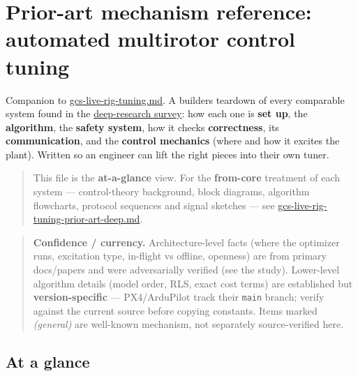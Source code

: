 \documentclass[
  11pt,
]{article}
\author{}
\date{}
\begin{document}
\hypertarget{prior-art-mechanism-reference-automated-multirotor-control-tuning}{%
\section{Prior-art mechanism reference: automated multirotor control
tuning}\label{prior-art-mechanism-reference-automated-multirotor-control-tuning}}

Companion to \url{gcs-live-rig-tuning.md}. A builder\textquotesingle s
teardown of every comparable system found in the
\href{gcs-live-rig-tuning.md\#feasibility-verdict}{deep-research
survey}: how each one is \textbf{set up}, the \textbf{algorithm}, the
\textbf{safety system}, how it checks \textbf{correctness}, its
\textbf{communication}, and the \textbf{control mechanics} (where and
how it excites the plant). Written so an engineer can lift the right
pieces into their own tuner.

\begin{quote}
This file is the \textbf{at-a-glance} view. For the \textbf{from-core}
treatment of each system --- control-theory background, block diagrams,
algorithm flowcharts, protocol sequences and signal sketches --- see
\url{gcs-live-rig-tuning-prior-art-deep.md}.
\end{quote}

\begin{quote}
\textbf{Confidence / currency.} Architecture-level facts (where the
optimizer runs, excitation type, in-flight vs offline, openness) are
from primary docs/papers and were adversarially verified (see the
study). Lower-level algorithm details (model order, RLS, exact cost
terms) are established but \textbf{version-specific} --- PX4/ArduPilot
track their \texttt{main} branch; verify against the current source
before copying constants. Items marked \emph{(general)} are well-known
mechanism, not separately source-verified here.
\end{quote}

\hypertarget{at-a-glance}{%
\subsection{At a glance}\label{at-a-glance}}
\end{document}
